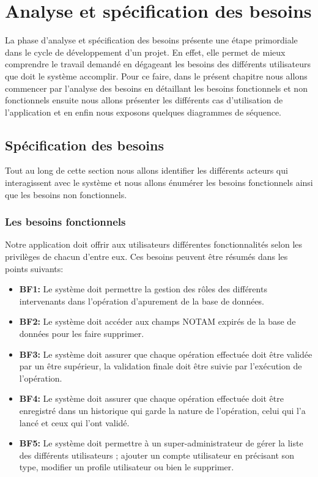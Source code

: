 \chapter{Analyse et spécification des besoins}

La phase d’analyse et spécification des besoins présente une étape primordiale dans le cycle de développement d’un projet. En effet, elle permet de mieux comprendre le travail demandé en dégageant les besoins des différents utilisateurs que doit le système accomplir. Pour ce faire, dans le présent chapitre nous allons commencer par l’analyse des besoins en détaillant les besoins fonctionnels et non fonctionnels ensuite nous allons présenter les différents cas d’utilisation de l’application et en enfin nous exposons quelques diagrammes de séquence.

\section{Spécification des besoins}

Tout au long de cette section nous allons identifier les différents acteurs qui interagissent avec le système et nous allons énumérer les besoins fonctionnels ainsi que les besoins non fonctionnels.


\subsection{Les besoins fonctionnels}

Notre application doit offrir aux utilisateurs différentes fonctionnalités selon les privilèges de chacun d’entre eux. Ces besoins peuvent être résumés dans les points suivants: \\
\begin{itemize}
\item \textbf{BF1:} Le système doit permettre la gestion des rôles des différents intervenants dans l’opération d’apurement de la base de données. \\
\item \textbf{BF2:} Le système doit accéder aux champs NOTAM expirés de la base de données pour les faire supprimer.\\
\item \textbf{BF3:} Le système doit assurer que chaque opération effectuée doit être validée par un être supérieur, la validation finale doit être suivie par l’exécution de l’opération.\\
\item \textbf{BF4:} Le système doit assurer que chaque opération effectuée doit être enregistré dans un historique qui garde la nature de l’opération, celui qui l’a lancé et ceux qui l’ont validé.\\
\item \textbf{BF5:} Le système doit permettre à un super-administrateur de gérer la liste des différents utilisateurs ; ajouter un compte utilisateur en précisant son type, modifier un profile utilisateur ou bien le supprimer.\\
\end{itemize}

